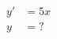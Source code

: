 \documentclass[preview]{standalone}
\begin{document}
\begin{align*}
y'&=5x \\ y&=?
\end{align*}
\end{document}
